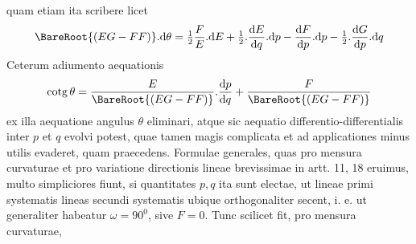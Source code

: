 quam etiam ita scribere licet
\[
\BareRoot{(EG-FF)}\mathord{.}\mathrm{d}\theta=\tfrac{1}{2}\frac{F}{E}\mathord{.}\mathrm{d}E+\tfrac{1}{2}\mathord{.}\frac{\mathrm{d}E}{\mathrm{d}q}\mathord{.}\mathrm{d}p-\frac{\mathrm{d}F}{\mathrm{d}p}\mathord{.}\mathrm{d}p-\tfrac{1}{2}\mathord{.}\frac{\mathrm{d}G}{\mathrm{d}p}\mathord{.}\mathrm{d}q
\]
Ceterum adiumento aequationis
\[
\mathrm{cotg}\,\theta=\frac{E}{\BareRoot{(EG-FF)}}\mathord{.}\frac{\mathrm{d}p}{\mathrm{d}q}+\frac{F}{\BareRoot{(EG-FF)}}
\]
ex illa aequatione angulus \(\theta\) eliminari, atque sic aequatio differentio-differentialis inter \(p\) et \(q\) evolvi potest, quae tamen magis complicata et ad applicationes minus utilis evaderet, quam praecedens.
Formulae generales, quas pro mensura curvaturae et pro variatione directionis lineae brevissimae in artt. 11, 18 eruimus, multo simpliciores fiunt, si quantitates \(p,q\) ita sunt electae, ut lineae primi systematis lineas secundi systematis ubique orthogonaliter secent, i. e. ut generaliter habeatur \(\omega=90^0\), sive \(F=0\). Tunc scilicet fit, pro mensura curvaturae,
